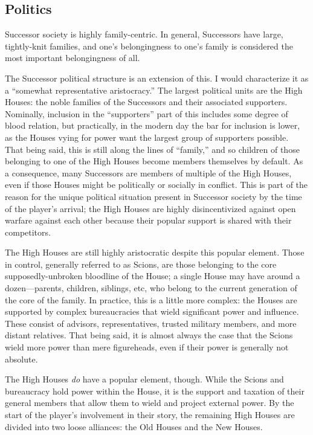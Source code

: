 \documentclass[11pt]{report}
\begin{document}
    \subsection{Politics}
    Successor society is highly family-centric. In general, Successors have large, tightly-knit families, and one's belongingness to one's family is considered the most important belongingness of all. 

    The Successor political structure is an extension of this. I would characterize it as a ``somewhat representative aristocracy.'' The largest political units are the High Houses: the noble families of the Successors and their associated supporters. Nominally, inclusion in the ``supporters'' part of this includes some degree of blood relation, but practically, in the modern day the bar for inclusion is lower, as the Houses vying for power want the largest group of supporters possible. That being said, this is still along the lines of ``family,'' and so children of those belonging to one of the High Houses become members themselves by default. As a consequence, many Successors are members of multiple of the High Houses, even if those Houses might be politically or socially in conflict. This is part of the reason for the unique political situation present in Successor society by the time of the player's arrival; the High Houses are highly disincentivized against open warfare against each other because their popular support is shared with their competitors.
    
    The High Houses are still highly aristocratic despite this popular element. Those in control, generally referred to as Scions, are those belonging to the core supposedly-unbroken bloodline of the House; a single House may have around a dozen---parents, children, siblings, etc, who belong to the current generation of the core of the family. In practice, this is a little more complex: the Houses are supported by complex bureaucracies that wield significant power and influence. These consist of advisors, representatives, trusted military members, and more distant relatives. That being said, it is almost always the case that the Scions wield more power than mere figureheads, even if their power is generally not absolute.
    
    The High Houses \emph{do} have a popular element, though. While the Scions and bureaucracy hold power within the House, it is the support and taxation of their general members that allow them to wield and project external power. By the start of the player's involvement in their story, the remaining High Houses are divided into two loose alliances: the Old Houses and the New Houses.
    
\end{document}
